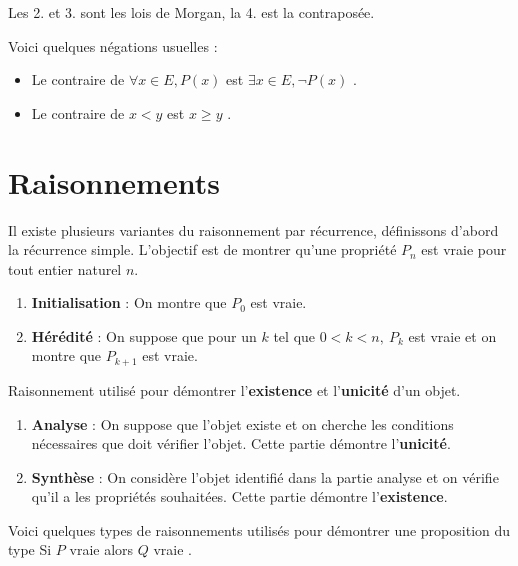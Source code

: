 \begin{remark}
    Les 2. et 3. sont les lois de Morgan, la 4. est la contraposée.
\end{remark}

\par \noindent Voici quelques négations usuelles :
\begin{itemize}
    \item Le contraire de \og $\forall x \in E, P(x)$ \fg est \og $\exists x \in E, \neg P(x)$ \fg.
    \item Le contraire de \og $x < y$ \fg est \og $x \geq y$ \fg.
\end{itemize}

\section{Raisonnements}

\begin{definition}
    Il existe plusieurs variantes du raisonnement par récurrence, définissons d'abord la récurrence simple. L'objectif est de montrer qu'une propriété $P_n$ est vraie pour tout entier naturel $n$. 
    \begin{enumerate}
        \item \textbf{Initialisation} : On montre que $P_0$ est vraie.
        \item \textbf{Hérédité} : On suppose que pour un $k$ tel que $0 < k < n,\ P_k$ est vraie et on montre que $P_{k+1}$ est vraie.
    \end{enumerate}
\end{definition}

\begin{definition}
	Raisonnement utilisé pour démontrer l'\textbf{existence} et l'\textbf{unicité} d'un objet.
	\begin{enumerate}
		\item \textbf{Analyse} : On suppose que l'objet existe et on cherche les conditions nécessaires que doit vérifier l'objet. Cette partie démontre l'\textbf{unicité}.
		\item \textbf{Synthèse} : On considère l'objet identifié dans la partie analyse et on vérifie qu'il a les propriétés souhaitées. Cette partie démontre l'\textbf{existence}.
	\end{enumerate}
\end{definition}

Voici quelques types de raisonnements utilisés pour démontrer une proposition du type \og Si $P$ vraie alors $Q$ vraie \fg.

